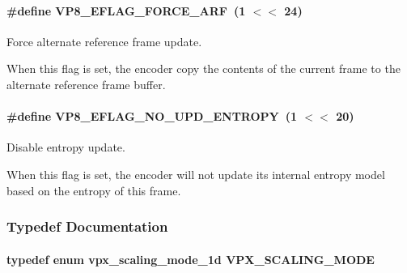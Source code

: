 \paragraph[{\texorpdfstring{V\+P8\+\_\+\+E\+F\+L\+A\+G\+\_\+\+F\+O\+R\+C\+E\+\_\+\+A\+RF}{VP8_EFLAG_FORCE_ARF}}]{\setlength{\rightskip}{0pt plus 5cm}\#define V\+P8\+\_\+\+E\+F\+L\+A\+G\+\_\+\+F\+O\+R\+C\+E\+\_\+\+A\+RF~(1 $<$$<$ 24)}\hypertarget{group__vp8__encoder_ga50584fe4bdb62ff935347576539650b7}{}\label{group__vp8__encoder_ga50584fe4bdb62ff935347576539650b7}


Force alternate reference frame update. 

When this flag is set, the encoder copy the contents of the current frame to the alternate reference frame buffer. 
\paragraph[{\texorpdfstring{V\+P8\+\_\+\+E\+F\+L\+A\+G\+\_\+\+N\+O\+\_\+\+U\+P\+D\+\_\+\+E\+N\+T\+R\+O\+PY}{VP8_EFLAG_NO_UPD_ENTROPY}}]{\setlength{\rightskip}{0pt plus 5cm}\#define V\+P8\+\_\+\+E\+F\+L\+A\+G\+\_\+\+N\+O\+\_\+\+U\+P\+D\+\_\+\+E\+N\+T\+R\+O\+PY~(1 $<$$<$ 20)}\hypertarget{group__vp8__encoder_ga5b91ad179910d4efc23aef66c7b2148b}{}\label{group__vp8__encoder_ga5b91ad179910d4efc23aef66c7b2148b}


Disable entropy update. 

When this flag is set, the encoder will not update its internal entropy model based on the entropy of this frame. 

\subsubsection{Typedef Documentation}
\paragraph[{\texorpdfstring{V\+P\+X\+\_\+\+S\+C\+A\+L\+I\+N\+G\+\_\+\+M\+O\+DE}{VPX_SCALING_MODE}}]{\setlength{\rightskip}{0pt plus 5cm}typedef enum {\bf vpx\+\_\+scaling\+\_\+mode\+\_\+1d}  {\bf V\+P\+X\+\_\+\+S\+C\+A\+L\+I\+N\+G\+\_\+\+M\+O\+DE}}\hypertarget{group__vp8__encoder_ga100ca891ad96995e61780ae777bf8663}{}\label{group__vp8__encoder_ga100ca891ad96995e61780ae777bf8663}


